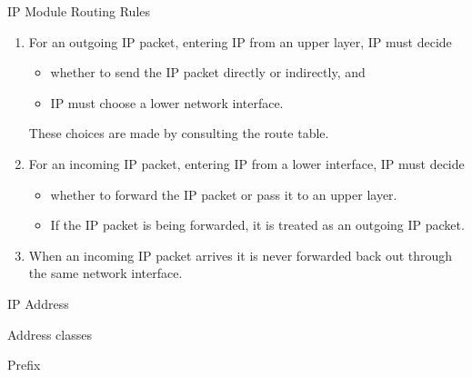 \begin{frame}{IP Module Routing Rules}
  \begin{minipage}{.8\linewidth}
  \begin{enumerate}
  \item For an outgoing IP packet, entering IP from an upper layer, IP must decide
    \begin{itemize}
    \item whether to send the IP packet directly or indirectly, and
    \item IP must choose a lower network interface.
    \end{itemize}
    These choices are made by consulting the route table.
  \item For an incoming IP packet, entering IP from a lower interface, IP must decide
    \begin{itemize}
    \item whether to forward the IP packet or pass it to an upper layer.
    \item If the IP packet is being forwarded, it is treated as an outgoing IP packet.
    \end{itemize}
  \item When an incoming IP packet arrives it is never forwarded back out through the same
    network interface.
  \end{enumerate}
\end{minipage}
\end{frame}

\begin{frame}{IP Address}
  \centering
  \mode<beamer>{ \texttt{[image: ipv4addr172]} }%
\end{frame}

\begin{frame}
  \begin{iblock}{Address classes}
    \centering
    \mode<beamer>{ \texttt{[image: ipv4addr]} }%
  \end{iblock}
\end{frame}

\begin{frame}{Prefix}
  \centering
  \mode<beamer>{\texttt{[image: prefix2]}}%
\end{frame}

